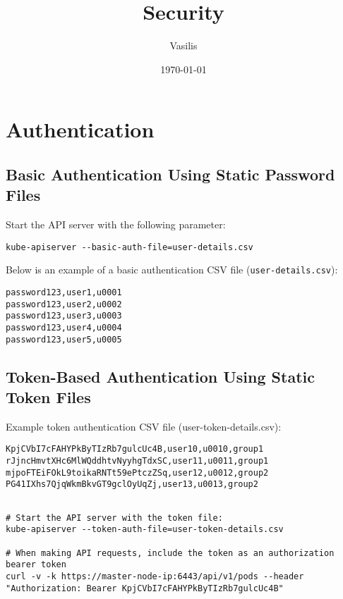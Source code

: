 \documentclass[11pt]{article}
\author{Vasilis}
\date{\today}
\title{Security}
\begin{document}
\maketitle
\tableofcontents

\section{Authentication}
\label{sec:org4014e1b}

\subsection{Basic Authentication Using Static Password Files}
\label{sec:org47c7d2c}

Start the API server with the following parameter:

\begin{verbatim}
kube-apiserver --basic-auth-file=user-details.csv
\end{verbatim}

Below is an example of a basic authentication CSV file (\texttt{user-details.csv}):

\begin{verbatim}
password123,user1,u0001
password123,user2,u0002
password123,user3,u0003
password123,user4,u0004
password123,user5,u0005
\end{verbatim}
\subsection{Token-Based Authentication Using Static Token Files}
\label{sec:orgd791913}

Example token authentication CSV file (user-token-details.csv):

\begin{verbatim}
KpjCVbI7cFAHYPkByTIzRb7gulcUc4B,user10,u0010,group1
rJjncHmvtXHc6MlWQddhtvNyyhgTdxSC,user11,u0011,group1
mjpoFTEiFOkL9toikaRNTt59ePtczZSq,user12,u0012,group2
PG41IXhs7QjqWkmBkvGT9gclOyUqZj,user13,u0013,group2
\end{verbatim}

\begin{verbatim}

# Start the API server with the token file:
kube-apiserver --token-auth-file=user-token-details.csv

# When making API requests, include the token as an authorization bearer token
curl -v -k https://master-node-ip:6443/api/v1/pods --header "Authorization: Bearer KpjCVbI7cFAHYPkByTIzRb7gulcUc4B"

\end{verbatim}
\end{document}
